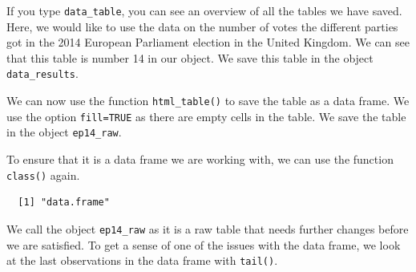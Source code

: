 \documentclass[12pt,oneside]{reedthesis}
\theoremstyle{definition}
\theoremstyle{definition}
\theoremstyle{definition}
\theoremstyle{remark}
\begin{document}
  \begin{Shaded}
  \begin{Highlighting}[]
  \StringTok{ }\NormalTok{)}
  \end{Highlighting}
  \end{Shaded}
  If you type \texttt{data\_table}, you can see an overview of all the
  tables we have saved. Here, we would like to use the data on the number
  of votes the different parties got in the 2014 European Parliament
  election in the United Kingdom. We can see that this table is number 14
  in our object. We save this table in the object \texttt{data\_results}.
  \begin{Shaded}
  \begin{Highlighting}[]
  \StringTok{ }\NormalTok{data_table[[}\NormalTok{]] }
  \end{Highlighting}
  \end{Shaded}
  We can now use the function \texttt{html\_table()} to save the table as
  a data frame. We use the option \texttt{fill=TRUE} as there are empty
  cells in the table. We save the table in the object \texttt{ep14\_raw}.
  \begin{Shaded}
  \begin{Highlighting}[]
  \StringTok{ }\NormalTok{)}
  \end{Highlighting}
  \end{Shaded}
  To ensure that it is a data frame we are working with, we can use the
  function \texttt{class()} again.
  \begin{Shaded}
  \begin{Highlighting}[]
  \end{Highlighting}
  \end{Shaded}
  \begin{verbatim}
  [1] "data.frame"
  \end{verbatim}
  We call the object \texttt{ep14\_raw} as it is a raw table that needs
  further changes before we are satisfied. To get a sense of one of the
  issues with the data frame, we look at the last observations in the data
  frame with \texttt{tail()}.
  \begin{Shaded}
  \begin{Highlighting}[]
  \end{Highlighting}
  \end{Shaded}
\end{document}
